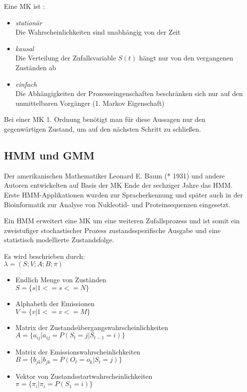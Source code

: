 Eine \acl{MK} ist \cite[48]{mmmFink}:
\begin{itemize}
     \item \textit{stationär} \\
           Die Wahrscheinlichkeiten sind unabhängig von der Zeit
     \item \textit{kausal} \\
           Die Verteilung der Zufallsvariable \( S(t)\) hängt nur von den vergangenen Zuständen ab
     \item \textit{einfach} \\
           Die Abhängigkeiten der Prozesseingenschaften beschränken sich nur auf den unmittelbaren Vorgänger (1. Markov Eigenschaft) 
\end{itemize}
Bei einer \acl{MK} 1. Ordnung benötigt man für diese Aussagen nur den gegenwärtigen Zustand, um auf den nächsten Schritt zu schließen.



\subsection{\acl{HMM} und \acl{GMM}}  \label{sec:hmm}
Der amerikanischen Mathematiker Leonard E. Baum (* 1931) und andere Autoren entwickelten auf Basis der \acl{MK} Ende der 
sechziger Jahre das \acl{HMM}. Erste \acl{HMM}-Applikationen wurden zur Spracherkennung und später auch in der Bioinformatik 
zur Analyse von Nukleotid- und Proteinsequenzen eingesetzt. 

Ein \acl{HMM} erweitert eine \acl{MK} um eine weiteren Zufallsprozess und ist somit ein zweistufiger stochastischer Prozess \cite[67]{mmmFink}
zustandsspezifische Ausgabe und eine statistisch modellierte Zustandsfolge. 


Es wird beschrieben durch:\\ 
\( \lambda = (S;V;A;B;\pi)\)
\begin{itemize}
     \item Endlich Menge von Zuständen \\
           \( S = \{ s | 1 <= s <= N \} \)
     \item Alphabeth der Emissionen \\
           \( V = \{ v | 1 <= v <= M \} \)
     \item Matrix der Zustandsübergangswahrscheinlichkeiten \\
           \( A = \{ a_{ij} | a_{ij} = P(S_t = j | S_{t-1} = i) \} \)
     \item Matrix der Emissionswahrscheinlichkeiten \\
           \( B = \{ b_{jk} | b_{jk} = P(O_t = o_k | S_t = j) \} \)
     \item Vektor von Zustandsstartwahrscheinlichkeiten \\
           \( \pi = \{ \pi_i | \pi_i = P(S_1 = i) \} \) 
\end{itemize}

